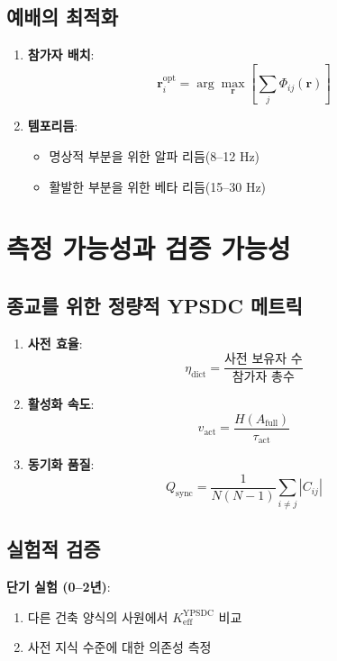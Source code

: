 \documentclass[12pt,a4paper]{article}
\begin{document}
	\subsection{예배의 최적화}
	
	\begin{enumerate}
		\item \textbf{참가자 배치}:
		\[
		\mathbf{r}_i^{\mathrm{opt}} = \arg\max_{\mathbf{r}} \left[\sum_j \Phi_{ij}(\mathbf{r})\right]
		\]
		\item \textbf{템포리듬}:
		\begin{itemize}
			\item 명상적 부분을 위한 알파 리듬(8–12 Hz)
			\item 활발한 부분을 위한 베타 리듬(15–30 Hz)
		\end{itemize}
	\end{enumerate}
	
	\section{측정 가능성과 검증 가능성}
	
	\subsection{종교를 위한 정량적 YPSDC 메트릭}
	
	\begin{enumerate}
		\item \textbf{사전 효율}:
		\[
		\eta_{\mathrm{dict}} = \frac{\text{사전 보유자 수}}{\text{참가자 총수}}
		\]
		\item \textbf{활성화 속도}:
		\[
		v_{\mathrm{act}} = \frac{H(A_{\mathrm{full}})}{\tau_{\mathrm{act}}}
		\]
		\item \textbf{동기화 품질}:
		\[
		Q_{\mathrm{sync}} = \frac{1}{N(N-1)} \sum_{i \neq j} |C_{ij}|
		\]
	\end{enumerate}
	
	\subsection{실험적 검증}
	
	\textbf{단기 실험 (0–2년)}:
	\begin{enumerate}
		\item 다른 건축 양식의 사원에서 $K_{\mathrm{eff}}^{\mathrm{YPSDC}}$ 비교
		\item 사전 지식 수준에 대한 의존성 측정
	\end{enumerate}
	
\end{document}
